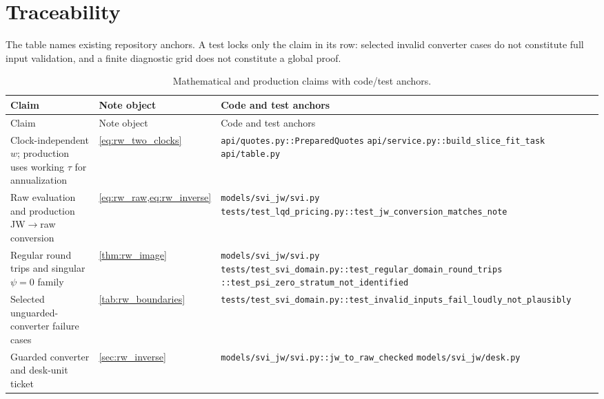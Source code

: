 \documentclass[11pt]{article}
\begin{document}
\section{Traceability}
\label{sec:rw_trace}

The table names existing repository anchors.  A test locks only the claim in
its row: selected invalid converter cases do not constitute full input
validation, and a finite diagnostic grid does not constitute a global proof.

\begingroup
\small
\setlength{\tabcolsep}{4pt}
\renewcommand{\arraystretch}{1.13}
\begin{longtable}{@{}p{}p{}p{}@{}}
\caption{Mathematical and production claims with code/test anchors.}\\
\toprule
Claim & Note object & Code and test anchors\\
\midrule
\endfirsthead
\toprule Claim & Note object & Code and test anchors\\ \midrule
\endhead
Clock-independent $w$; production uses working $\tau$ for annualization &
\cref{eq:rw_two_clocks} &
\nolinkurl{api/quotes.py::PreparedQuotes}\newline
\nolinkurl{api/service.py::build_slice_fit_task}\newline
\nolinkurl{api/table.py}\\
\addlinespace
Raw evaluation and production JW$\to$raw conversion &
\cref{eq:rw_raw,eq:rw_inverse} &
\nolinkurl{models/svi_jw/svi.py}\newline
\nolinkurl{tests/test_lqd_pricing.py::test_jw_conversion_matches_note}\\
\addlinespace
Regular round trips and singular $\psi=0$ family &
\cref{thm:rw_image} &
\nolinkurl{models/svi_jw/svi.py}\newline
\nolinkurl{tests/test_svi_domain.py::test_regular_domain_round_trips}\newline
\nolinkurl{::test_psi_zero_stratum_not_identified}\\
\addlinespace
Selected unguarded-converter failure cases &
\cref{tab:rw_boundaries} &
\nolinkurl{tests/test_svi_domain.py::test_invalid_inputs_fail_loudly_not_plausibly}\\
\addlinespace
Guarded converter and desk-unit ticket &
\cref{sec:rw_inverse} &
\nolinkurl{models/svi_jw/svi.py::jw_to_raw_checked}\newline
\nolinkurl{models/svi_jw/desk.py}\newline

\end{longtable}
\end{document}
